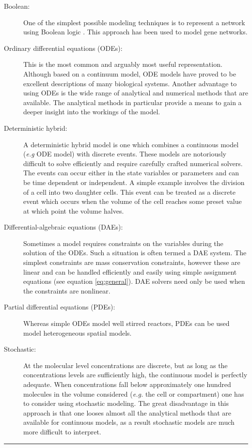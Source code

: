 \documentclass[]{article}
\begin{document}
\begin{description}
\item[Boolean:]
One of the simplest possible modeling techniques is to represent a
network using Boolean logic \autocite{DeJong2002}. This approach has
been used to model gene networks.

\item[Ordinary differential equations (ODEs):]
This is the most common and arguably most useful representation.
Although based on a continuum model, ODE models have proved to be
excellent descriptions of many biological systems. Another advantage to
using ODEs is the wide range of analytical and numerical methods that
are available. The analytical methods in particular provide a means to
gain a deeper insight into the workings of the model.

\item[Deterministic hybrid:]
A deterministic hybrid model is one which combines a continuous model
(\emph{e.g} ODE model) with discrete events. These models are
notoriously difficult to solve efficiently and require carefully crafted
numerical solvers. The events can occur either in the state variables or
parameters and can be time dependent or independent. A simple example
involves the division of a cell into two daughter cells. This event can
be treated as a discrete event which occurs when the volume of the cell
reaches some preset value at which point the volume halves.

\item[Differential-algebraic equations (DAEs):]
Sometimes a model requires constraints on the variables during the
solution of the ODEs. Such a situation is often termed a DAE system. The
simplest constraints are mass conservation constraints, however these
are linear and can be handled efficiently and easily using simple
assignment equations (see equation \ref{eq:general}). DAE solvers need
only be used when the constraints are nonlinear.

\item[Partial differential equations (PDEs):]
Whereas simple ODEs model well stirred reactors, PDEs can be used model
heterogeneous spatial models.

\item[Stochastic:]
At the molecular level concentrations are discrete, but as long as the
concentrations levels are sufficiently high, the continuous model is
perfectly adequate. When concentrations fall below approximately one
hundred molecules in the volume considered (\emph{e.g.} the cell or
compartment) one has to consider using stochastic modeling. The great
disadvantage in this approach is that one looses almost all the
analytical methods that are available for continuous models, as a result
stochastic models are much more difficult to interpret.

\end{description}
\begin{center}\rule{3in}{0.4pt}\end{center}
\end{document}
